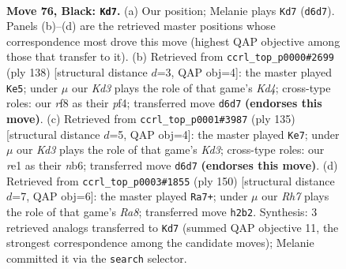 \documentclass[11pt]{article}
\begin{document}
\clearpage

\begin{figure}[p]\centering
\begin{subfigure}{0.46\textwidth}\centering
\resizebox{\linewidth}{!}{%
\newchessgame
\chessboard[
  setfen={5R2/8/3k4/3b4/1P6/3K4/7r/4R3 b - - 26 76},
  showmover=false,
  pgfstyle=straightmove, color=movearrow, markmove={d6-d7}
]}
\caption{}
\end{subfigure}\hfill
\begin{subfigure}{0.46\textwidth}\centering
\resizebox{\linewidth}{!}{%
\newchessgame
\chessboard[
  setfen={8/6R1/8/3B4/3K1p1k/r7/8/8 w - - 8 70},
  showmover=false,
  pgfstyle=straightmove, color=movearrow, markmove={d4-e5}
]}
\caption{}
\end{subfigure}
\\[4pt]
\begin{subfigure}{0.46\textwidth}\centering
\resizebox{\linewidth}{!}{%
\newchessgame
\chessboard[
  setfen={8/8/1N1kb3/R7/7P/8/5K2/2r5 b - - 13 68},
  showmover=false,
  pgfstyle=straightmove, color=movearrow, markmove={d6-e7}
]}
\caption{}
\end{subfigure}\hfill
\begin{subfigure}{0.46\textwidth}\centering
\resizebox{\linewidth}{!}{%
\newchessgame
\chessboard[
  setfen={R7/5kp1/2r5/4KB2/8/8/8/8 w - - 55 76},
  showmover=false,
  pgfstyle=straightmove, color=movearrow, markmove={a8-a7}
]}
\caption{}
\end{subfigure}
\caption{\textbf{Move 76, Black: \texttt{Kd7}.} (a) Our position; Melanie plays \texttt{Kd7} (\texttt{d6d7}). Panels (b)--(d) are the retrieved master positions whose correspondence most drove this move (highest QAP objective among those that transfer to it). (b) Retrieved from \texttt{ccrl\_top\_p0000\#2699} (ply 138) [structural distance $d$=3, QAP obj=4]: the master played \texttt{Ke5}; under $\mu$ our \emph{Kd3} plays the role of that game's \emph{Kd4}; cross-type roles: our \emph{r}f8 as their \emph{p}f4; transferred move \texttt{d6d7} \textbf{(endorses this move)}. (c) Retrieved from \texttt{ccrl\_top\_p0001\#3987} (ply 135) [structural distance $d$=5, QAP obj=4]: the master played \texttt{Ke7}; under $\mu$ our \emph{Kd3} plays the role of that game's \emph{Kd3}; cross-type roles: our \emph{r}e1 as their \emph{n}b6; transferred move \texttt{d6d7} \textbf{(endorses this move)}. (d) Retrieved from \texttt{ccrl\_top\_p0003\#1855} (ply 150) [structural distance $d$=7, QAP obj=6]: the master played \texttt{Ra7+}; under $\mu$ our \emph{Rh7} plays the role of that game's \emph{Ra8}; transferred move \texttt{h2b2}. Synthesis: 3 retrieved analogs transferred to \texttt{Kd7} (summed QAP objective 11, the strongest correspondence among the candidate moves); Melanie committed it via the \texttt{search} selector.}
\label{fig:thought-m151}
\end{figure}
\end{document}
